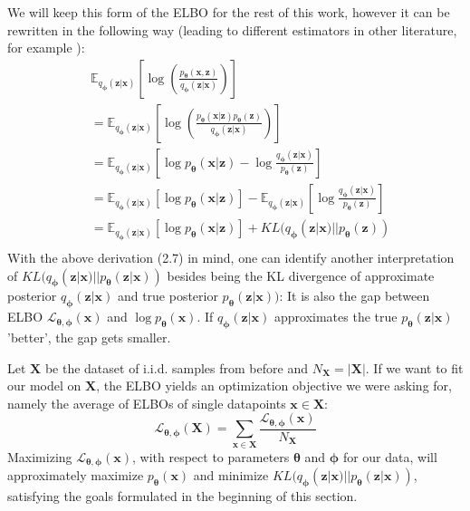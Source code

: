 \documentclass[12pt]{report}
\theoremstyle{definition}
\begin{document}
We will keep this form of the ELBO for the rest of this work, however it can be rewritten in the following way (leading to different estimators in other literature, for example \cite{kingma2}):
\begin{equation}
\begin{split}
& \mathbb{E}_{q_{\pmb{\phi}}(\mathbf{z}|\mathbf{x})}\left[ \log\left(\frac{p_{\pmb{\theta}}(\mathbf{x}, \mathbf{z})}{q_{\pmb{\phi}}(\mathbf{z}|\mathbf{x})}\right) \right] \\
& = \mathbb{E}_{q_{\pmb{\phi}}(\mathbf{z}|\mathbf{x})}\left[ \log\left(\frac{p_{\pmb{\theta}}(\mathbf{x}|\mathbf{z})p_{\pmb{\theta}}(\mathbf{z})}{q_{\pmb{\phi}}(\mathbf{z}|\mathbf{x})}\right) \right] \\
	& = \mathbb{E}_{q_{\pmb{\phi}}(\mathbf{z}|\mathbf{x})}\left[ \log p_{\pmb{\theta}}(\mathbf{x}| \mathbf{z}) - \log \frac{q_{\pmb{\phi}}(\mathbf{z}|\mathbf{x})}{p_{\pmb{\theta}}(\mathbf{z})} \right]	\\
	& = \mathbb{E}_{q_{\pmb{\phi}}(\mathbf{z}|\mathbf{x})}\left[ \log p_{\pmb{\theta}}(\mathbf{x}| \mathbf{z})\right] - \mathbb{E}_{q_{\pmb{\phi}}(\mathbf{z}|\mathbf{x})}\left[\log \frac{q_{\pmb{\phi}}(\mathbf{z}|\mathbf{x})}{p_{\pmb{\theta}}(\mathbf{z})} \right]	\\
	& = \mathbb{E}_{q_{\pmb{\phi}}(\mathbf{z}|\mathbf{x})}\left[ \log p_{\pmb{\theta}}(\mathbf{x}| \mathbf{z})\right] + KL(q_{\pmb{\phi}}(\mathbf{z}|\mathbf{x})||p_{\pmb{\theta}}(\mathbf{z}))\\
\end{split}
\end{equation}
With the above derivation (2.7) in mind, one can identify another interpretation of $KL(q_{\pmb{\phi}}(\mathbf{z}|\mathbf{x}) || p_{\pmb{\theta}}(\mathbf{z}|\mathbf{x}))$ besides being the KL divergence of approximate posterior $q_{\pmb{\phi}}(\mathbf{z}|\mathbf{x})$ and true posterior $p_{\pmb{\theta}}(\mathbf{z}| \mathbf{x}))$: It is also the gap between ELBO $\mathcal{L}_{\pmb{\theta}, \pmb{\phi}}(\mathbf{x})$ and $\log p_{\pmb{\theta}}(\mathbf{x})$. If $q_{\pmb{\phi}}(\mathbf{z}|\mathbf{x})$ approximates the true $p_{\pmb{\theta}}(\mathbf{z}|\mathbf{x})$ 'better', the gap gets smaller.

Let $\mathbf{X}$ be the dataset of i.i.d. samples from before and $N_{\mathbf{X}} = |\mathbf{X}|$. If we want to fit our model on $\mathbf{X}$, the ELBO yields an optimization objective we were asking for, namely the average of ELBOs of single datapoints $\mathbf{x} \in \mathbf{X}$:
\begin{equation}
	\mathcal{L}_{\pmb{\theta}, \pmb{\phi}}(\mathbf{X}) = \sum_{\mathbf{x} \in \mathbf{X}} \frac{\mathcal{L}_{\pmb{\theta}, \pmb{\phi}}(\mathbf{x})}{N_{\mathbf{X}}}
\end{equation}
Maximizing $\mathcal{L}_{\pmb{\theta}, \pmb{\phi}}(\mathbf{x})$, with respect to parameters $\pmb{\theta}$ and $\pmb{\phi}$ for our data, will approximately maximize $p_{\pmb{\theta}}(\mathbf{x})$ and minimize $KL(q_{\pmb{\phi}}(\mathbf{z}|\mathbf{x}) || p_{\pmb{\theta}}(\mathbf{z}| \mathbf{x}))$, satisfying the goals formulated in the beginning of this section.
\end{document}
